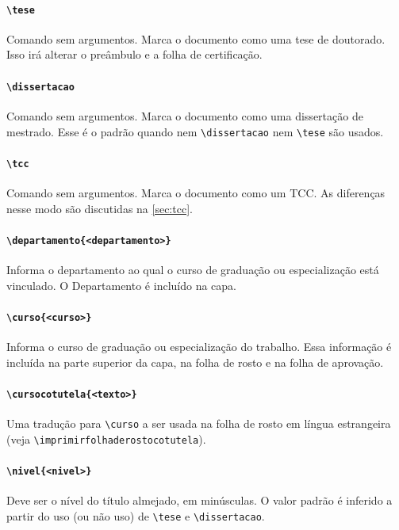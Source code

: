 \documentclass[embeddedlogo]{ufsc-thesis-rn46-2019}
\newcommand{\lacmd}[1]{\texttt{\textbackslash{}#1}}
\begin{document}
\paragraph*{\lacmd{tese}} Comando sem argumentos. Marca o documento como uma
tese de doutorado. Isso irá alterar o preâmbulo e a folha de certificação.

\paragraph*{\lacmd{dissertacao}} Comando sem argumentos. Marca o documento como
uma dissertação de mestrado. Esse é o padrão quando nem \lacmd{dissertacao} nem
\lacmd{tese} são usados.

\paragraph*{\lacmd{tcc}} Comando sem argumentos. Marca o documento como um
TCC. As diferenças nesse modo são discutidas na \autoref{sec:tcc}.

\paragraph*{\lacmd{departamento\{<departamento>\}}} Informa o departamento ao
qual o curso de graduação ou especialização está vinculado. O Departamento é
incluído na capa.

\paragraph*{\lacmd{curso\{<curso>\}}} Informa o curso de graduação
ou especialização do trabalho. Essa informação é incluída na parte superior da
capa, na folha de rosto e na folha de aprovação.

\paragraph*{\lacmd{cursocotutela\{<texto>\}}} Uma tradução para
\lacmd{curso} a ser usada na folha de rosto em língua estrangeira (veja
\lacmd{imprimirfolhaderostocotutela}).

\paragraph*{\lacmd{nivel\{<nivel>\}}} Deve ser o nível do título almejado, em
minúsculas. O valor padrão é inferido a partir do uso (ou não uso) de
\lacmd{tese} e \lacmd{dissertacao}.
\end{document}
